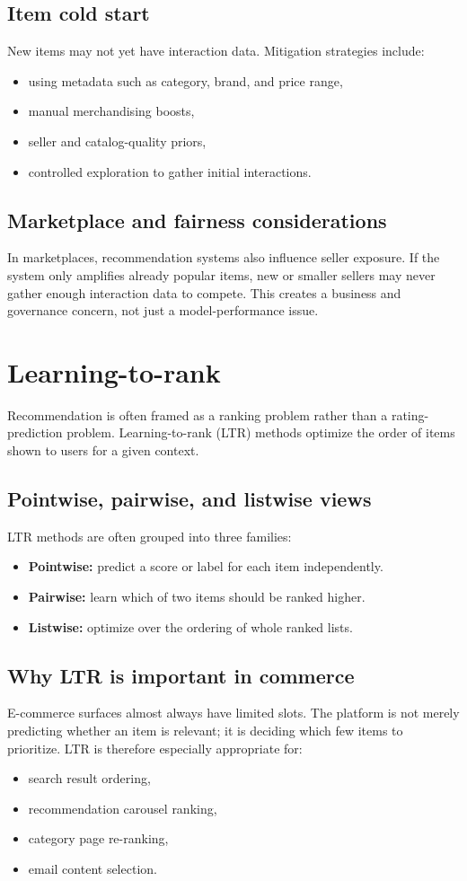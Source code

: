 \subsection{Item cold start}
New items may not yet have interaction data.
Mitigation strategies include:
\begin{itemize}
  \item using metadata such as category, brand, and price range,
  \item manual merchandising boosts,
  \item seller and catalog-quality priors,
  \item controlled exploration to gather initial interactions.
\end{itemize}

\subsection{Marketplace and fairness considerations}
In marketplaces, recommendation systems also influence seller exposure.
If the system only amplifies already popular items, new or smaller sellers may never gather enough interaction data to compete.
This creates a business and governance concern, not just a model-performance issue.

\section{Learning-to-rank}
Recommendation is often framed as a ranking problem rather than a rating-prediction problem.
Learning-to-rank (LTR) methods optimize the order of items shown to users for a given context.

\subsection{Pointwise, pairwise, and listwise views}
LTR methods are often grouped into three families:
\begin{itemize}
  \item \textbf{Pointwise:} predict a score or label for each item independently.
  \item \textbf{Pairwise:} learn which of two items should be ranked higher.
  \item \textbf{Listwise:} optimize over the ordering of whole ranked lists.
\end{itemize}

\subsection{Why LTR is important in commerce}
E-commerce surfaces almost always have limited slots.
The platform is not merely predicting whether an item is relevant; it is deciding which few items to prioritize.
LTR is therefore especially appropriate for:
\begin{itemize}
  \item search result ordering,
  \item recommendation carousel ranking,
  \item category page re-ranking,
  \item email content selection.
\end{itemize}

